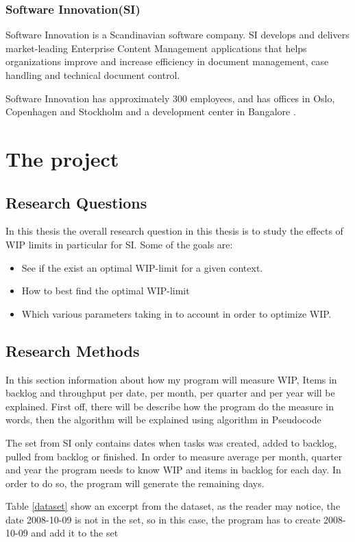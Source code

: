 \documentclass[UKenglish]{ifimaster}  %
\begin{document}
\section{Software Innovation(SI)}
Software Innovation is a Scandinavian software company. SI develops and delivers market-leading Enterprise Content Management applications that helps organizations improve and increase efficiency in document management, case handling and technical document control.

Software Innovation has approximately 300 employees, and has offices in Oslo, Copenhagen and Stockholm and a development center in Bangalore \parencite{SI}.


\part{The project}                    %
\chapter{Research Questions}
In this thesis the overall research question in this thesis is to study the effects of WIP limits in particular for SI. Some of the goals are:
\begin{itemize} 
\item See if the exist an optimal WIP-limit for a given context.
\item How to best find the optimal WIP-limit
\item Which various parameters taking in to account in order to optimize WIP. 
\end{itemize}
\chapter{Research Methods}
In this section information about how my program will measure WIP, Items in backlog and throughput per date, per month, per quarter and per year will be explained. First off, there will be describe how the program do the measure in words, then the algorithm will be explained using algorithm in Pseudocode \parencite{jd}

The set from SI only contains dates when tasks was created, added to backlog, pulled from backlog or finished.  In order to measure average per month, quarter and year the program needs to know WIP and items in backlog for each day. In order to do so, the program will generate the remaining days.

Table \ref {dataset} show an excerpt from the dataset, as the reader may notice, the date 2008-10-09 is not in the set, so in this case, the program has to create 2008-10-09 and add it to the set
\end{document}
